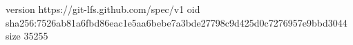 version https://git-lfs.github.com/spec/v1
oid sha256:7526ab81a6fbd86eac1e5aa6bebe7a3bde27798c9d425d0c7276957e9bbd3044
size 35255

